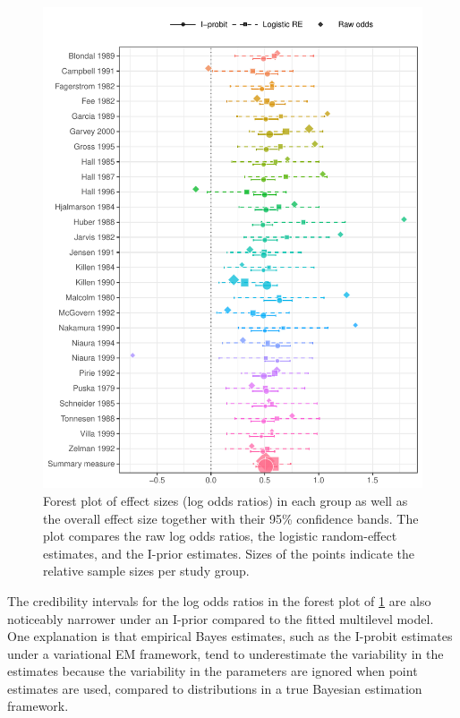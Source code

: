 \documentclass[a4paper,showframe,11pt]{report}\usepackage[]{graphicx}\usepackage[]{color}
\newenvironment{knitrout}{}{} %
\begin{document}
\begin{knitrout}
\color{fgcolor}\begin{figure}[p]

{\centering \includegraphics[width=\linewidth]{figure/05-smoke_forest_plot-1} 

}

\caption[Forest plot of effect sizes (log odds ratios) in each group as well as the overall effect size together with their 95\% confidence bands]{Forest plot of effect sizes (log odds ratios) in each group as well as the overall effect size together with their 95\% confidence bands. The plot compares the raw log odds ratios, the logistic random-effect estimates, and the I-prior estimates. Sizes of the points indicate the relative sample sizes per study group.}\label{fig:smoke.forest.plot}
\end{figure}


\end{knitrout}

The credibility intervals for the log odds ratios in the forest plot of \cref{fig:smoke.forest.plot} are also noticeably narrower under an I-prior compared to the fitted multilevel model.
One explanation is that empirical Bayes estimates, such as the I-probit estimates under a variational EM framework, tend to underestimate the variability in the estimates because the variability in the parameters are ignored when point estimates are used, compared to distributions in a true Bayesian estimation framework.
\end{document}
